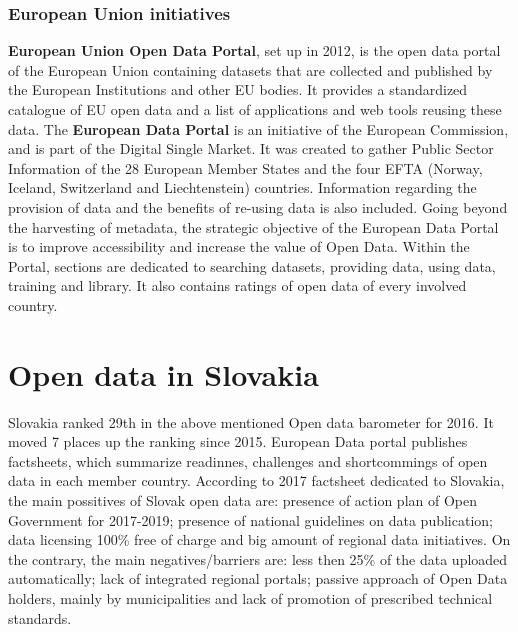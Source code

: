 \documentclass[thesis=B,english]{FITthesis}[2012/06/26]
\begin{document}
	\subsection{European Union initiatives}
\textbf{European Union Open Data Portal}, set up in 2012, is the open data portal of the European Union containing datasets that are collected and published by the European Institutions and other EU bodies. It provides a standardized catalogue of EU open data and a list of applications and web tools reusing these data. \cite{EUopendataportal}
\hspace{10000px}
The \textbf{European Data Portal} is an initiative of the European Commission, and is part of the Digital Single Market. It was created to gather Public Sector Information of the 28 European Member States and the four EFTA (Norway, Iceland, Switzerland and Liechtenstein) countries. Information regarding the provision of data and the benefits of re-using data is also included. Going beyond the harvesting of metadata, the strategic objective of the European Data Portal is to improve accessibility and increase the value of Open Data. Within the Portal, sections are dedicated to searching datasets, providing data, using data, training and library. It also contains ratings of open data of every involved country. \cite{eudataportal}

\chapter{Open data in Slovakia}
	Slovakia ranked 29th in the above mentioned Open data barometer for 2016. It moved 7 places up the ranking since 2015. European Data portal publishes factsheets, which summarize readinnes, challenges and shortcommings of open data in each member country. According to 2017 factsheet dedicated to Slovakia, the main possitives of Slovak open data are: presence of action plan of Open Government for 2017-2019; presence of national guidelines on data publication; data licensing 100\% free of charge and big amount of regional data initiatives. On the contrary, the main negatives/barriers are: less then 25\% of the data uploaded automatically; lack of integrated regional portals; passive approach of Open Data holders, mainly by municipalities and lack of promotion of prescribed technical standards. \cite{eudataportalfactsheet}
\end{document}
